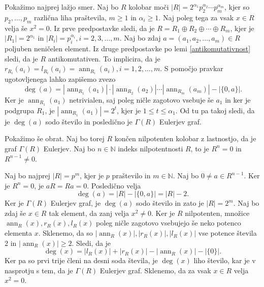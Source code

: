 \documentclass[a4paper, 12pt]{amsart}
\theoremstyle{definition} %
\theoremstyle{plain} %
\newcommand{\N}{\mathbb N}
\DeclareMathOperator{\ann}{ann}
\begin{document}
\proof
Pokažimo najprej lažjo smer. Naj bo $R$ kolobar moči $|R| = 2^{\alpha_1} p_2^{\alpha_2} \cdots  p_m^{\alpha_m}$, kjer so $p_2, \dots, p_m$ različna liha praštevila, $m\ge 1$ in $\alpha_i \ge 1$. Naj poleg tega za vsak $x\in R$ velja še $x^2 = 0$. Iz prve predpostavke sledi, da je $R = R_1 \oplus R_2 \oplus \cdots \oplus R_m$, kjer je $|R_1| = 2^{\alpha_1}$ in $|R_i| = p_i ^{\alpha_i}, i = 2,3,\dots,m$. Naj bo zdaj $a=(a_1,a_2,\dots,a_m)\in R$ poljuben neničelen element. Iz druge predpostavke po lemi \ref{antikomutativnost} sledi, da je $R$ antikomutativen. To implicira, da je $r_{R_i}(a_i) =l_{R_i}(a_i) = \ann_{R_i}(a_i), i=1,2,\dots,m$. S pomočjo pravkar ugotovljenega lahko zapišemo zvezo
$$
\deg(a) = |\ann_{R_1}(a_1)|\cdot|\ann_{R_2}(a_2)|\cdots|\ann_{R_m}(a_m)| - |\{0,a\}|.
$$
Ker je $\ann_{R_1}(a_1)$ netrivialen, saj poleg ničle zagotovo vsebuje še $a_1$ in ker je podgrupa $R_1$, je $|\ann_{R_1}(a_1)| = 2^{t}$, kjer je $1 \le t \le \alpha_1$. Od tu pa takoj sledi, da je $\deg(a)$ sodo število in posledično je $\Gamma(R)$ Eulerjev graf.

Pokažimo še obrat. Naj bo torej $R$ končen nilpotenten kolobar z lastnostjo, da je graf $\Gamma(R)$ Eulerjev. Naj bo $n\in \N$ indeks nilpotentnosti $R$, to je $R^n = 0$ in $R^{n-1}\neq 0$. 

Naj bo najprej $|R| = p^m$, kjer je $p$ praštevilo in $m\in \N$. Naj bo $0\neq a \in R^{n-1}$. Ker je $R^n = 0$, je $aR = Ra = 0$. Posledično velja 
$$
\deg(a)  = |R| -|\{0,a\}| = |R| - 2.
$$
Ker je $\Gamma(R)$ Eulerjev graf, je $\deg(a)$ sodo število in zato je $|R| = 2^m$. Naj bo zdaj še $x\in R$ tak element, da zanj velja $x^2 \neq 0$. Ker je $R$ nilpotenten, množice $\ann_R(x), r_R(x),l_R(x) $ poleg ničle zagotovo vsebujejo še neko potenco elementa $x$. Sklenemo, da so $| \ann_R(x)|, |r_R(x)|, |l_R(x)| $ vse potence števila 2 in $|\ann_R(x) | \ge 2$. Sledi, da je 
$$
\deg(x) = |l_R(x) | + |r_R(x)| - |\ann_R(x)| - |\{0\}|.
$$
Ker pa so prvi trije členi na desni soda števila, je $\deg(x)$ liho število, kar je v nasprotju s tem, da je $\Gamma(R)$ Eulerjev graf. Sklenemo, da za vsak $x\in R $ velja $x^2=0$.
\end{document}
